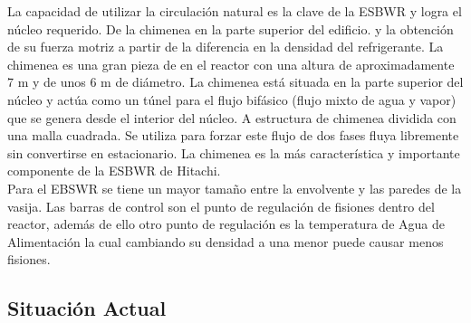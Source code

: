 \documentclass[]{article}
\begin{document}
La capacidad de utilizar la circulación natural es la clave de la ESBWR y logra el núcleo requerido. De la chimenea en la parte superior del edificio. y la obtención de su fuerza motriz a partir de la diferencia en la densidad del refrigerante. La chimenea es una gran pieza de en el reactor con una altura de aproximadamente 7 m y de unos 6 m de diámetro. La chimenea está situada en la parte superior del núcleo y actúa como un túnel para el flujo bifásico (flujo mixto de agua y vapor) que se genera desde el interior del núcleo. A estructura de chimenea dividida con una malla cuadrada. Se utiliza para forzar este flujo de dos fases fluya libremente sin convertirse en estacionario. La chimenea es la más característica y
importante componente de la ESBWR de Hitachi.\citep{Matsuura2009}\\


Para el EBSWR se tiene un mayor tamaño entre la envolvente y las paredes de la vasija. Las barras de control son el punto de regulación de fisiones dentro del reactor, además de ello otro punto de regulación es la temperatura de Agua de Alimentación la cual cambiando su densidad a una menor puede causar menos fisiones.\\



\subsection{Situación Actual}
\end{document}
